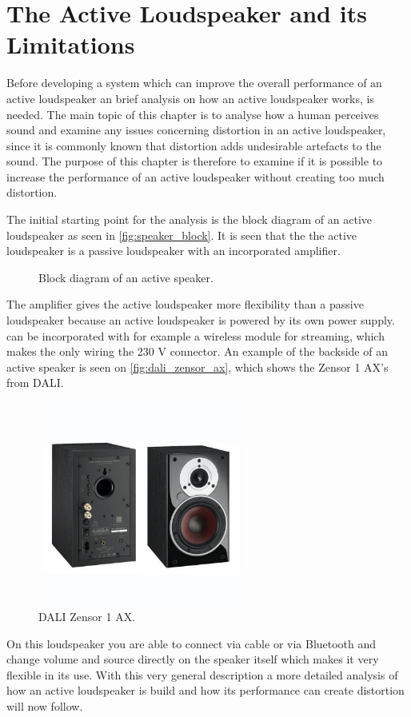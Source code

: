 


\chapter{The Active Loudspeaker and its Limitations}
Before developing a system which can improve the overall performance of an active loudspeaker an brief analysis on how an active loudspeaker works, is needed. The main topic of this chapter is to analyse how a human perceives sound and examine any issues concerning distortion in an active loudspeaker, since it is commonly known that distortion adds undesirable artefacts to the sound. The purpose of this chapter is therefore to examine if it is possible to increase the performance of an active loudspeaker without creating too much distortion. 

The initial starting point for the analysis is the block diagram of an active loudspeaker as seen in \autoref{fig:speaker_block}. It is seen that the the active loudspeaker is a passive loudspeaker with an incorporated amplifier.

\begin{figure}[H]
\centering
{}
\scalebox{0.9}{
}
\caption{Block diagram of an active speaker.}
\label{fig:speaker_block}
\end{figure}
The amplifier gives the active loudspeaker more flexibility than a passive loudspeaker because an active loudspeaker is powered by its own power supply. can be incorporated with for example a wireless module for streaming, which makes the only wiring the 230 V connector. An example of the backside of an active speaker is seen on \autoref{fig:dali_zensor_ax}, which shows the Zensor 1 AX's from DALI.
\begin{figure}[H]
\centering
\includegraphics[width=0.6\textwidth]{figures/dali_zensor_1_ax.jpg}
\caption{DALI Zensor 1 AX.}
\label{fig:dali_zensor_ax}
\end{figure}
On this loudspeaker you are able to connect via cable or via Bluetooth and change volume and source directly on the speaker itself which makes it very flexible in its use. With this very general description a more detailed analysis of how an active loudspeaker is build and how its performance can create distortion will now follow. 


